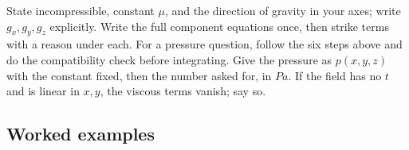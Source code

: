 \begin{firstmoves}
State incompressible, constant $\mu$, and the direction of gravity in your axes; write $g_x, g_y, g_z$ explicitly. Write the full component equations once, then strike terms with a reason under each. For a pressure question, follow the six steps above and do the compatibility check before integrating. Give the pressure as $p(x,y,z)$ with the constant fixed, then the number asked for, in $\unit{Pa}$. If the field has no $t$ and is linear in $x, y$, the viscous terms vanish; say so.
\end{firstmoves}

\subsection*{Worked examples}

